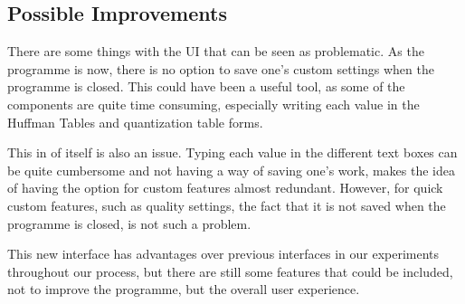 \subsection{Possible Improvements}
There are some things with the UI that can be seen as problematic. As the programme is now, there is no option to save one's custom settings when the programme is closed. This could have been a useful tool, as some of the components are quite time consuming, especially writing each value in the Huffman Tables and quantization table forms.

This in of itself is also an issue. Typing each value in the different text boxes can be quite cumbersome and not having a way of saving one's work, makes the idea of having the option for custom features almost redundant. However, for quick custom features, such as quality settings, the fact that it is not saved when the programme is closed, is not such a problem.

This new interface has advantages over previous interfaces in our experiments throughout our process, but there are still some features that could be included, not to improve the programme, but the overall user experience.


